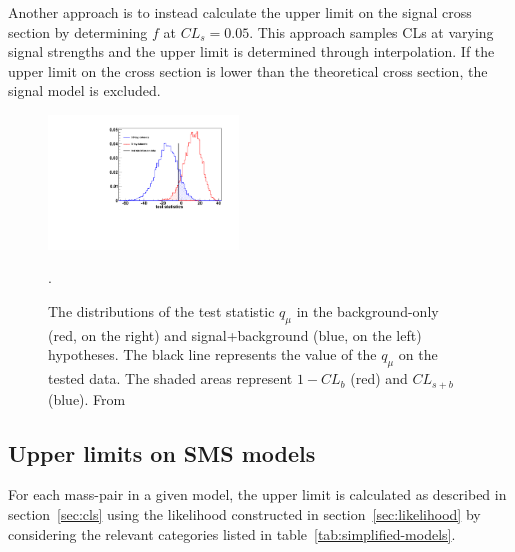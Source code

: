 Another approach is to instead calculate the upper limit on the signal 
cross section by determining $f$ at $CL_{s} = 0.05$.  This approach samples 
CLs at varying signal strengths and the upper limit is 
determined through interpolation. If the upper limit on the cross section 
is lower than the theoretical cross section, the signal model is excluded.

\begin{figure}[h!t]
  \begin{center}
      \includegraphics[width=0.45\textwidth,]{figures/hybrid_plot}
      \caption{\label{fig:hybrid_plot} The distributions of the test statistic $q_{\mu}$
        in the background-only (red, on the right) and signal+background (blue, on the left) hypotheses. 
        The black line represents the value of the $q_{\mu}$ on the tested data. The shaded areas represent 
        $1-CL_{b}$ (red) and $CL_{s+b}$ (blue).  From~\cite{Moneta:1289965}}.
    \label{fig:hybrid_plot}
  \end{center}
\end{figure}


\subsection{Upper limits on SMS models}

For each mass-pair in a given model, the upper limit is calculated as described in 
section~\ref{sec:cls} using the likelihood constructed in section~\ref{sec:likelihood}
by considering the relevant categories listed in table~\ref{tab:simplified-models}.

